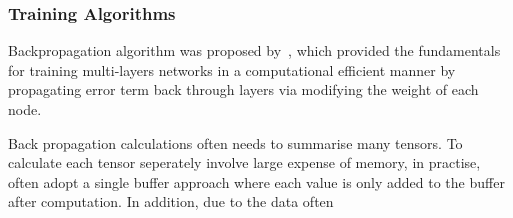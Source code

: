 \subsubsection{Training Algorithms}
Backpropagation algorithm was proposed by~\citet{werbos1975beyond}, which provided the fundamentals for training multi-layers networks in a computational efficient manner by propagating error term back through layers via modifying the weight of each node. 
\par
Back propagation calculations often needs to summarise many tensors. To calculate each tensor seperately involve large expense of memory, in practise, often adopt a single buffer approach where each value is only added to the buffer after computation. In addition, due to the data often 